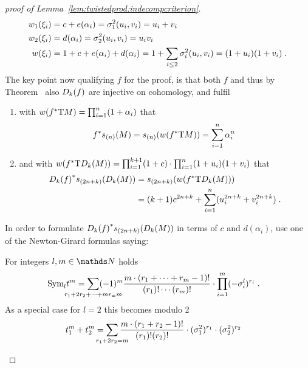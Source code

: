 \begin{proof}[proof of Lemma~\ref{lem:twistedprod:indecompcriterion}]
\begin{align*}
      {w_{1}}(\xi_i) &= c+e(\alpha_i) = \sigma_{1}^{2}(u_i, v_i) = u_i+v_i \\
      {w_{2}}(\xi_i) &= d(\alpha_i)   = \sigma_{2}^{2}(u_i, v_i) = u_iv_i \\
      {w}(\xi_i)  &= 1+c+e(\alpha_i)+d(\alpha_i)
                   = 1+\sum_{i\leq2}\sigma_{i}^{2}(u_i,v_i) = (1+u_i)(1+v_i)
                   \;.
    \end{align*}
    The key point now qualifying $f$ for the proof, is that both $f$ and
    thus by
    Theorem~
    also $D_{k}({f})$ are injective on cohomology, and fulfil
    \begin{enumerate}
    \item with ${w}({f}^*\mathrm{T}M) = \prod_{i=1}^n (1+\alpha_i)$ that
      \begin{gather}\label{eq:lem:twistedprod:indecompcriterion:sM}
        {f}^* s_{(n)}(M)
        = s_{(n)}({w}({f}^*\mathrm{T}M))
        = \sum_{i=1}^n \alpha_i^n
        \;
      \end{gather}
    \item and with
      ${w}({f}^*\mathrm{T}D_{k}({M}))
      = \prod_{i=1}^{k+1}(1+c) \cdot \prod_{i=1}^n
      (1+u_i)(1+v_i)$
      that
      \begin{align}\notag
        {D_{k}({f})}^* s_{(2n+k)}(D_{k}({M}))
        &= s_{(2n+k)}({w}({f}^*\mathrm{T}D_{k}({M}))) \\
        \label{eq:lem:twistedprod:indecompcriterion:sDkM}
        &= (k+1)c^{2n+k} + \sum_{i=1}^n (u_i^{2n+k} + v_i^{2n+k})
          \;.
      \end{align}
    \end{enumerate}
    In order to formulate
    ${D_{k}({f})}^*s_{(2n+k)}(D_{k}({M}))$ 
    in terms of $c$ and $d(\alpha_i)$,
    use one of the Newton-Girard formulas saying:
    \begin{Lem}
      For integers $l, m\in\Nat$ holds
      \begin{align*}
        \symm{l} t^m
        &= \sum_{\mathclap{r_1+2r_2+\dotsb+mr_=m}}
          (-1)^m \frac{m\cdot(r_1+\dotsb+r_m-1)!}{(r_1)!\dotsm(r_m)!}
          \cdot \prod_{i=1}^m (-\el i l)^{r_i}
          \;.
      \end{align*}
      As a special case for $l=2$ this becomes modulo 2
      \begin{align*}
        t_1^m + t_2^m
        &= \sum_{\mathclap{r_1+2r_2=m}}
          \frac{m\cdot(r_1+r_2-1)!}{(r_1)!(r_2)!}
          \cdot (\el 1 2)^{r_1} \cdot (\el 2 2)^{r_2}

\end{align*}
\end{Lem}
\end{proof}
